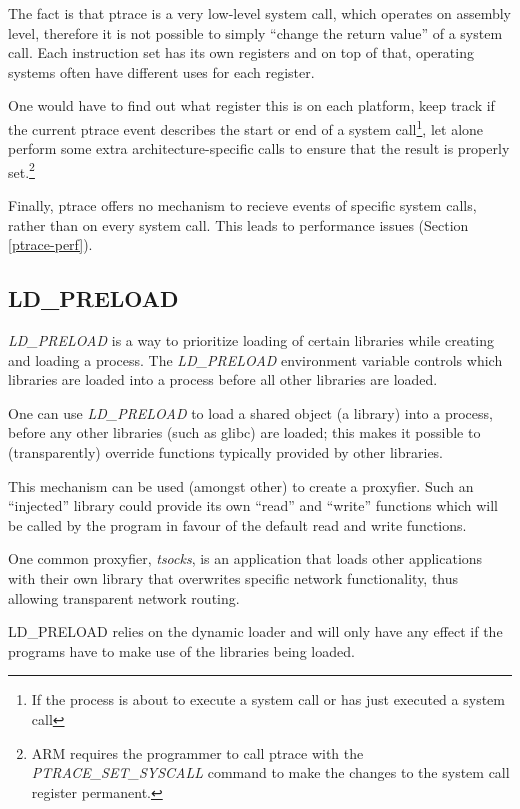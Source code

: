 \documentclass[a4paper, 10pt]{report}
\begin{document}
The fact is that ptrace is a very low-level system call, which operates on
assembly level, therefore it is not possible to simply ``change the return
value'' of a system call. Each instruction set has its own registers and on
top of that, operating systems often have different uses for each register.

One would have to find out what register this is on each platform,
keep track if the current ptrace event describes the start or end of a system
call\footnote{If the process is about to execute a system call or has just
executed a system call}, let alone perform some extra architecture-specific
calls to ensure that the result is properly set.\footnote{ARM requires
the programmer to call ptrace with the \textit{PTRACE\_SET\_SYSCALL} command
to make the changes to the system call register permanent.}

Finally, ptrace offers no mechanism to recieve events of specific system calls,
rather than on every system call. This leads to performance issues (Section
\ref{ptrace-perf}).

\subsection{LD\_PRELOAD}

\textit{LD\_PRELOAD} is a way to prioritize loading of certain libraries
while creating and loading a process. The \textit{LD\_PRELOAD} environment
variable controls which libraries are loaded into a process before all
other libraries are loaded.

One can use \textit{LD\_PRELOAD} to load a shared object (a library)
into a process, before any other libraries (such as glibc) are loaded;
this makes it possible to (transparently) override functions typically
provided by other libraries.

This mechanism can be used (amongst other) to create a proxyfier.
Such an ``injected'' library could provide its own ``read'' and
``write'' functions which will be called by the program in favour of
the default read and write functions.

One common proxyfier, \textit{tsocks}, is an application that loads
other applications with their own library that overwrites specific
network functionality, thus allowing transparent network routing.

LD\_PRELOAD relies on the dynamic loader and will only have any effect
if the programs have to make use of the libraries being loaded.
\end{document}
